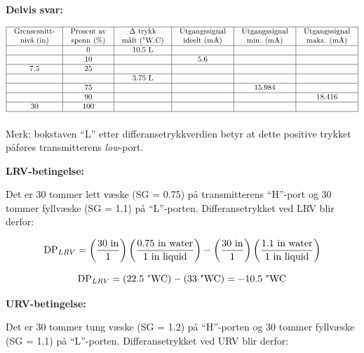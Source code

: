 





{\bf Delvis svar:}


$$\vbox{\offinterlineskip
\halign{\strut
\vrule \quad\hfil # \ \hfil & 
\vrule \quad\hfil # \ \hfil & 
\vrule \quad\hfil # \ \hfil & 
\vrule \quad\hfil # \ \hfil & 
\vrule \quad\hfil # \ \hfil & 
\vrule \quad\hfil # \ \hfil \vrule \cr
\noalign{\hrule}
%
Grensesnitt- & Prosent av & $\Delta$ trykk & Utgangssignal & Utgangssignal & Utgangssignal \cr
%
nivå (in) & spenn (\%) & målt ("W.C) & ideelt (mA) & min. (mA) & maks. (mA) \cr
%
\noalign{\hrule}
%
 & 0 & 10.5 L &  &  &  \cr
%
\noalign{\hrule}
%
 & 10 &  & 5.6 &  &  \cr
%
\noalign{\hrule}
%
7.5 & 25 &  &  &  &  \cr
%
\noalign{\hrule}
%
 &  & 3.75 L &  &  &  \cr
%
\noalign{\hrule}
%
 & 75 &  &  & 15.984 &  \cr
%
\noalign{\hrule}
%
 & 90 & &  &  & 18.416 \cr
%
\noalign{\hrule}
%
30 & 100 &  & &  &  \cr
%
\noalign{\hrule}
} %
}$$ %

Merk: bokstaven ``L'' etter differansetrykkverdien betyr at dette positive trykket påføres transmitterens {\it low}-port.







\noindent
{\bf LRV-betingelse:}

Det er 30 tommer lett væske (SG = 0.75) på transmitterens ``H''-port og 30 tommer fyllvæske (SG = 1.1) på ``L''-porten.  Differansetrykket ved LRV blir derfor:

$$\hbox{DP}_{LRV} = \left(30 \hbox{ in} \over 1 \right) \left(0.75 \hbox{ in water} \over 1 \hbox{ in liquid} \right) - \left(30 \hbox{ in} \over 1 \right) \left(1.1 \hbox{ in water} \over 1 \hbox{ in liquid} \right) $$

$$\hbox{DP}_{LRV} = (22.5 \hbox{ "WC}) - (33 \hbox{ "WC}) = -10.5 \hbox{ "WC}$$

\vskip 10pt

\noindent
{\bf URV-betingelse:}

Det er 30 tommer tung væske (SG = 1.2) på ``H''-porten og 30 tommer fyllvæske (SG = 1.1) på ``L''-porten.  Differansetrykket ved URV blir derfor:

